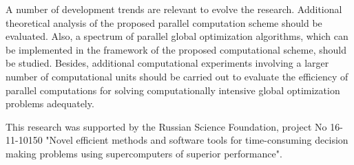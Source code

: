 \documentclass[
11pt,%
tightenlines,%
twoside,%
onecolumn,%
nofloats,%
nobibnotes,%
nofootinbib,%
superscriptaddress,%
noshowpacs,%
centertags]%
{revtex4}
\begin{document}
A number of development trends are relevant to evolve the research. Additional theoretical analysis of the proposed parallel computation scheme should be evaluated. Also, a spectrum of parallel global optimization algorithms, which can be implemented in the framework of the proposed computational scheme, should be studied. Besides, additional computational experiments involving a larger number of computational units should be carried out to evaluate the efficiency of parallel computations for solving computationally intensive global optimization problems adequately.


\begin{acknowledgments}
This research was supported by the Russian Science Foundation, project No 16-11-10150 "Novel efficient methods and software tools for time-consuming decision making problems using supercomputers of superior performance".
\end{acknowledgments}
\end{document}
